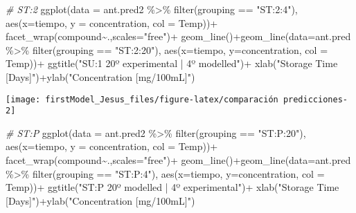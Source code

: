 \documentclass[
]{article}
\newenvironment{Shaded}{\begin{snugshade}}{\end{snugshade}}
\newcommand{\AttributeTok}[1]{\textcolor[rgb]{0.77,0.63,0.00}{#1}}
\newcommand{\CommentTok}[1]{\textcolor[rgb]{0.56,0.35,0.01}{\textit{#1}}}
\newcommand{\FunctionTok}[1]{\textcolor[rgb]{0.00,0.00,0.00}{#1}}
\newcommand{\NormalTok}[1]{#1}
\newcommand{\SpecialCharTok}[1]{\textcolor[rgb]{0.00,0.00,0.00}{#1}}
\newcommand{\StringTok}[1]{\textcolor[rgb]{0.31,0.60,0.02}{#1}}
\begin{document}
\begin{Shaded}
\begin{Highlighting}[]
\CommentTok{\# ST:2}
\FunctionTok{ggplot}\NormalTok{(}\AttributeTok{data =}\NormalTok{ ant.pred2 }\SpecialCharTok{\%\textgreater{}\%} \FunctionTok{filter}\NormalTok{(grouping }\SpecialCharTok{==} \StringTok{"ST:2:4"}\NormalTok{), }\FunctionTok{aes}\NormalTok{(}\AttributeTok{x=}\NormalTok{tiempo, }\AttributeTok{y =}\NormalTok{ concentration, }\AttributeTok{col =}\NormalTok{ Temp))}\SpecialCharTok{+}
  \FunctionTok{facet\_wrap}\NormalTok{(compound}\SpecialCharTok{\textasciitilde{}}\NormalTok{.,}\AttributeTok{scales=}\StringTok{"free"}\NormalTok{)}\SpecialCharTok{+}
  \FunctionTok{geom\_line}\NormalTok{()}\SpecialCharTok{+}\FunctionTok{geom\_line}\NormalTok{(}\AttributeTok{data=}\NormalTok{ant.pred }\SpecialCharTok{\%\textgreater{}\%} \FunctionTok{filter}\NormalTok{(grouping }\SpecialCharTok{==} \StringTok{"ST:2:20"}\NormalTok{), }\FunctionTok{aes}\NormalTok{(}\AttributeTok{x=}\NormalTok{tiempo, }\AttributeTok{y=}\NormalTok{concentration, }\AttributeTok{col =}\NormalTok{ Temp))}\SpecialCharTok{+}
  \FunctionTok{ggtitle}\NormalTok{(}\StringTok{"SU:1 20º experimental | 4º modelled"}\NormalTok{)}\SpecialCharTok{+} \FunctionTok{xlab}\NormalTok{(}\StringTok{"Storage Time [Days]"}\NormalTok{)}\SpecialCharTok{+}\FunctionTok{ylab}\NormalTok{(}\StringTok{"Concentration [mg/100mL]"}\NormalTok{)}
\end{Highlighting}
\end{Shaded}

\begin{center}\texttt{[image: firstModel\_Jesus\_files/figure-latex/comparación predicciones-2]} \end{center}

\begin{Shaded}
\begin{Highlighting}[]
\CommentTok{\# ST:P}
\FunctionTok{ggplot}\NormalTok{(}\AttributeTok{data =}\NormalTok{ ant.pred2 }\SpecialCharTok{\%\textgreater{}\%} \FunctionTok{filter}\NormalTok{(grouping }\SpecialCharTok{==} \StringTok{"ST:P:20"}\NormalTok{), }\FunctionTok{aes}\NormalTok{(}\AttributeTok{x=}\NormalTok{tiempo, }\AttributeTok{y =}\NormalTok{ concentration, }\AttributeTok{col =}\NormalTok{ Temp))}\SpecialCharTok{+}
  \FunctionTok{facet\_wrap}\NormalTok{(compound}\SpecialCharTok{\textasciitilde{}}\NormalTok{.,}\AttributeTok{scales=}\StringTok{"free"}\NormalTok{)}\SpecialCharTok{+}
  \FunctionTok{geom\_line}\NormalTok{()}\SpecialCharTok{+}\FunctionTok{geom\_line}\NormalTok{(}\AttributeTok{data=}\NormalTok{ant.pred }\SpecialCharTok{\%\textgreater{}\%} \FunctionTok{filter}\NormalTok{(grouping }\SpecialCharTok{==} \StringTok{"ST:P:4"}\NormalTok{), }\FunctionTok{aes}\NormalTok{(}\AttributeTok{x=}\NormalTok{tiempo, }\AttributeTok{y=}\NormalTok{concentration, }\AttributeTok{col =}\NormalTok{ Temp))}\SpecialCharTok{+}
  \FunctionTok{ggtitle}\NormalTok{(}\StringTok{"ST:P 20º modelled | 4º experimental"}\NormalTok{)}\SpecialCharTok{+} \FunctionTok{xlab}\NormalTok{(}\StringTok{"Storage Time [Days]"}\NormalTok{)}\SpecialCharTok{+}\FunctionTok{ylab}\NormalTok{(}\StringTok{"Concentration [mg/100mL]"}\NormalTok{)}
\end{Highlighting}
\end{Shaded}
\end{document}
